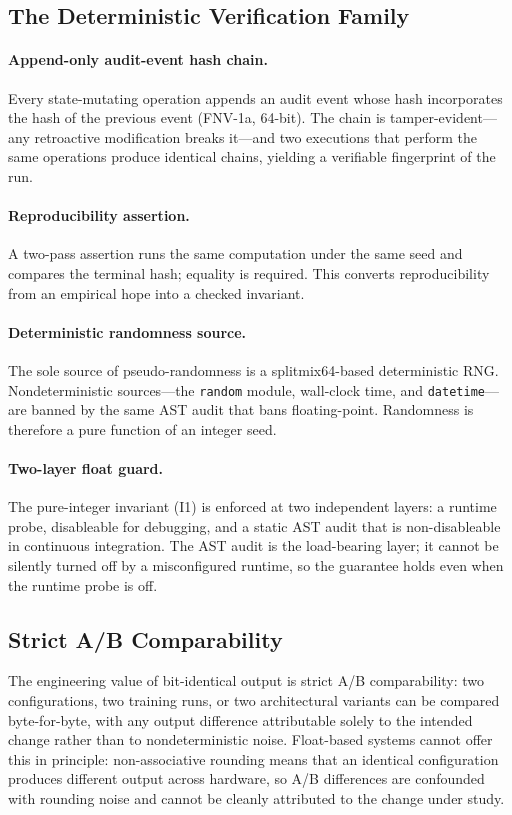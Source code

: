 \documentclass[11pt,a4paper]{article}
\begin{document}
\subsection{The Deterministic Verification Family}

\paragraph{Append-only audit-event hash chain.}
Every state-mutating operation appends an audit event whose hash
incorporates the hash of the previous event (FNV-1a, 64-bit). The chain
is tamper-evident---any retroactive modification breaks it---and two
executions that perform the same operations produce identical chains,
yielding a verifiable fingerprint of the run.

\paragraph{Reproducibility assertion.}
A two-pass assertion runs the same computation under the same seed and
compares the terminal hash; equality is required. This converts
reproducibility from an empirical hope into a checked invariant.

\paragraph{Deterministic randomness source.}
The sole source of pseudo-randomness is a splitmix64-based deterministic
RNG. Nondeterministic sources---the \texttt{random} module, wall-clock
time, and \texttt{datetime}---are banned by the same AST audit that bans
floating-point. Randomness is therefore a pure function of an integer
seed.

\paragraph{Two-layer float guard.}
The pure-integer invariant (I1) is enforced at two independent layers: a
runtime probe, disableable for debugging, and a static AST audit that is
non-disableable in continuous integration. The AST audit is the
load-bearing layer; it cannot be silently turned off by a misconfigured
runtime, so the guarantee holds even when the runtime probe is off.

\subsection{Strict A/B Comparability}
The engineering value of bit-identical output is strict A/B
comparability: two configurations, two training runs, or two
architectural variants can be compared byte-for-byte, with any output
difference attributable solely to the intended change rather than to
nondeterministic noise. Float-based systems cannot offer this in
principle: non-associative rounding means that an identical configuration
produces different output across hardware, so A/B differences are
confounded with rounding noise and cannot be cleanly attributed to the
change under study.
\end{document}
